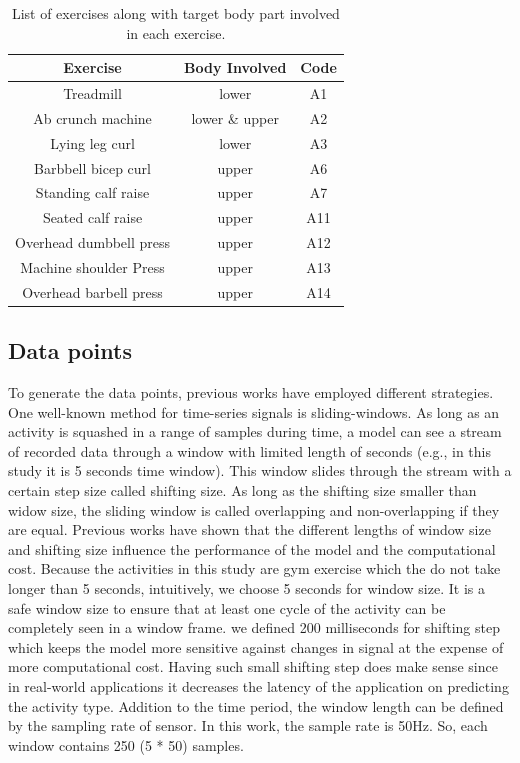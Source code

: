 \documentclass[journal,article,submit,moreauthors,pdftex]{Definitions/mdpi}
\begin{document}
\begin{table}[H]
	\caption{List of exercises along with target body part involved in each exercise.}
	\centering
	\begin{tabular}{ccc}
		\toprule
		\textbf{Exercise}	& \textbf{Body Involved}	& \textbf{Code}\\
		\midrule
		Treadmill		& lower 			& A1\\
		Ab crunch machine		& lower \& upper & A2\\
		Lying leg curl		& lower			& A3\\
		Barbbell bicep curl		& upper			& A6\\
		Standing calf raise		& upper			& A7 \\
		Seated calf raise		& upper			& A11 \\
		Overhead dumbbell press		& upper			& A12 \\
		Machine shoulder Press		& upper			& A13 \\
		Overhead barbell press		& upper			& A14 \\
		\bottomrule
	\end{tabular}
\label{activity_list}
\end{table}
\subsection{Data points}
To generate the data points, previous works have employed different strategies. One well-known method for time-series signals is sliding-windows. As long as an activity is squashed in a range of samples during time, a model can see a stream of recorded data through a window with limited length of seconds (e.g., in this study it is 5 seconds time window). This window slides through the stream with a certain step size called shifting size. As long as the shifting size smaller than widow size, the sliding window is called overlapping and non-overlapping if they are equal. Previous works have shown that the different lengths of window size and shifting size influence the performance of the model and the computational cost. Because the activities in this study are gym exercise which the do not take longer than 5 seconds, intuitively, we choose 5 seconds for window size. It is a safe window size to ensure that at least one cycle of the activity can be completely seen in a window frame. we defined 200 milliseconds for shifting step which keeps the model more sensitive against changes in signal at the expense of more computational cost. Having such small shifting step does make sense since in real-world applications it decreases the latency of the application on predicting the activity type. Addition to the time period, the window length can be defined by the sampling rate of sensor. In this work, the sample rate is 50Hz. So, each window contains 250 (5 * 50) samples.
\end{document}
